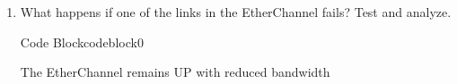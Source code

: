 \documentclass[a4paper]{article}
\begin{document}
\begin{enumerate}
\begin{ocg}{Code Block}{codeblock}{0}
	      \end{ocg}


	\item What happens if one of the links in the EtherChannel fails? Test and analyze.


	      \begin{ocg}{Code Block}{codeblock}{0}

		      \vspace{0.5cm}
		      \begin{tcolorbox}
			      The EtherChannel remains UP with reduced bandwidth
		      \end{tcolorbox}
	      \end{ocg}


\end{enumerate}
\end{document}
